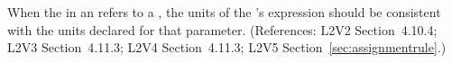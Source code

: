 When the  in an \InitialAssignment refers to a \Parameter,
the units of the \InitialAssignment's  expression should be
consistent with the units declared for that parameter.  (References: L2V2
Section~4.10.4; L2V3 Section~4.11.3; L2V4 Section~4.11.3; L2V5 Section~\ref{sec:assignmentrule}.)
